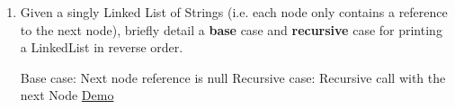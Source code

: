 \documentclass[addpoints]{exam}
\begin{document}
\begin{enumerate}
  \item {}
Given a singly Linked List of Strings (i.e. each node only contains a reference to the next node), briefly detail a \textbf{base} case and \textbf{recursive} case for printing a LinkedList in reverse order.

\begin{oneparchoices} 
\hspace{0.2cm}
 \vspace{2em}
 \choice Base case: 
 \Ans Next node reference is null \newline
 \choice Recursive case: \Ans Recursive call with the next Node
 \newline \newline
 \Ans \href{http://cscircles.cemc.uwaterloo.ca/java_visualize/#code=/*%0A+*+Andrew+Blejde%0A+*+Reverse+print+Linked+List+w/Recursion%0A+*+CS180+Week+15%0A+*/%0Aclass+Node%0A%7B%0A%09String+str%3B%0A%09Node+next%3B%0A%09%09%0A%09public+Node(String+str)%0A%09%7B%0A%09%09this.str+%3D+str%3B%0A%09%09this.next+%3D+null%3B%0A%09%7D%0A%7D%0Apublic+class+MyList%0A%7B%0A%09public+Node+head%3B%0A%0A%09public+void+print(Node+n)%0A%09%7B%0A%09%09if(n.next+!%3D+null)%0A%09%09%09print(n.next)%3B%0A%0A%09%09System.out.println(n.str)%3B%0A%09%7D%0A%09public+void+add(String+str)%0A%09%7B%0A%09%09if(head+%3D%3D+null)%0A%09%09%7B%0A%09%09%09head+%3D+new+Node(str)%3B%0A%09%09%09return%3B%0A%09%09%7D%0A%0A%09%09Node+current+%3D+head%3B%0A%09%09while(current.next+!%3D+null)%0A%09%09%09current+%3D+current.next%3B%0A%0A%09%09current.next+%3D+new+Node(str)%3B%0A%0A%09%7D%0A%09public+static+void+main(String%5B%5D+args)%0A%09%7B%0A%0A%09%09MyList+ml+%3D+new+MyList()%3B%0A%09%09ml.add(%22Andrew%22)%3B%0A%09%09ml.add(%22Maria%22)%3B%0A%09%09ml.add(%22Joseph%22)%3B%0A%09%09ml.add(%22Sahil%22)%3B%0A%0A%09%09ml.print(ml.head)%3B%0A%0A%09%7D%0A%7D&mode=}{Demo}
 \end{oneparchoices}
\vspace{2em}
\end{enumerate}
\end{document}
